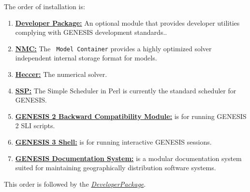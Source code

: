 \documentclass[12pt]{article}
\begin{document}
The order of installation is:
\begin{enumerate}
\item \href{../developer-package/developer-package.tex}{\bf Developer
    Package:} An optional module that provides developer utilities
  complying with GENESIS development standards..
\item \href{../model-container/model-container.tex}{\bf NMC:} The {\tt
    Model Container} provides a highly optimized solver independent
  internal storage format for models.
\item \href{../heccer/heccer.tex}{\bf Heccer:} The numerical solver.
\item \href{../ssp/ssp.tex}{\bf SSP:} The Simple Scheduler in Perl is
  currently the standard scheduler for GENESIS.
\item \href{../backward-compatibility/backward-compatibility.tex}{\bf
    GENESIS 2 Backward Compatibility Module:} is for running GENESIS 2
  SLI scripts.
\item \href{../gshell/gshell.tex}{\bf GENESIS 3 Shell:} is for running
  interactive GENESIS sessions.
\item \href{../documentation-overview/documentation-overview.tex}{\bf
    GENESIS Documentation System:} is a modular documentation system
  suited for maintaining geographically distribution software systems.
\end{enumerate} 

This order is followed by the \href{../developer_package/developer_package.tex}{\it DeveloperPackage}.



\end{document}
